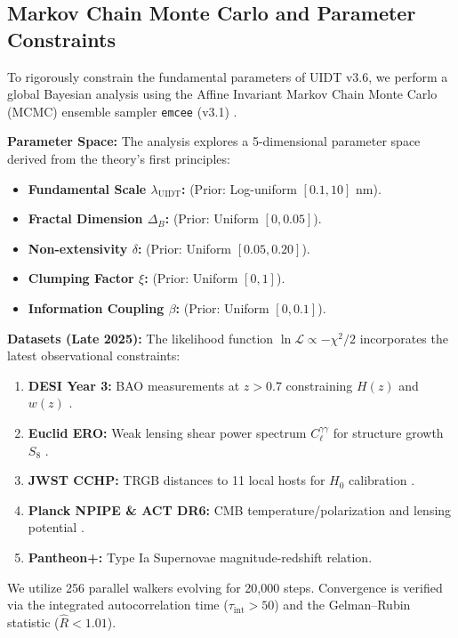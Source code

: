 \subsection{Markov Chain Monte Carlo and Parameter Constraints}
\label{subsec:mcmc}

To rigorously constrain the fundamental parameters of UIDT v3.6, we perform a global Bayesian analysis using the Affine Invariant Markov Chain Monte Carlo (MCMC) ensemble sampler \texttt{emcee} (v3.1) \citep{ForemanMackey2013}.

\textbf{Parameter Space:} The analysis explores a 5-dimensional parameter space derived from the theory's first principles:

\begin{itemize}
    \item \textbf{Fundamental Scale $\lambda_{\mathrm{UIDT}}$:} (Prior: Log-uniform $[0.1, 10]$ nm).
    \item \textbf{Fractal Dimension $\Delta_B$:} (Prior: Uniform $[0, 0.05]$).
    \item \textbf{Non-extensivity $\delta$:} (Prior: Uniform $[0.05, 0.20]$).
    \item \textbf{Clumping Factor $\xi$:} (Prior: Uniform $[0, 1]$).
    \item \textbf{Information Coupling $\beta$:} (Prior: Uniform $[0, 0.1]$).
\end{itemize}

\textbf{Datasets (Late 2025):} The likelihood function $\ln \mathcal{L} \propto -\chi^2/2$ incorporates the latest observational constraints:

\begin{enumerate}
    \item \textbf{DESI Year 3:} BAO measurements at $z > 0.7$ constraining $H(z)$ and $w(z)$ \citep{DESI_Y3_2025}.
    \item \textbf{Euclid ERO:} Weak lensing shear power spectrum $C_\ell^{\gamma\gamma}$ for structure growth $S_8$ \citep{Euclid_ERO_2024}.
    \item \textbf{JWST CCHP:} TRGB distances to 11 local hosts for $H_0$ calibration \citep{Freedman2025}.
    \item \textbf{Planck NPIPE \& ACT DR6:} CMB temperature/polarization and lensing potential \citep{Planck_NPIPE_2020,Naess2025}.
    \item \textbf{Pantheon+:} Type Ia Supernovae magnitude-redshift relation.
\end{enumerate}

We utilize 256 parallel walkers evolving for 20,000 steps. Convergence is verified via the integrated autocorrelation time ($\tau_{\mathrm{int}} > 50$) and the Gelman--Rubin statistic ($\hat{R} < 1.01$).

